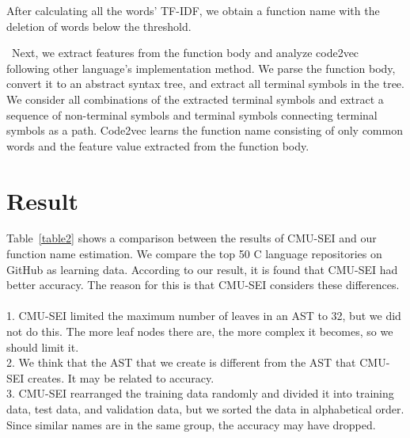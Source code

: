 \documentclass[JIP]{apris}
\begin{document}
After calculating all the words' TF-IDF, we obtain a function name with the deletion of words below the threshold.

 Next, we extract features from the function body and analyze code2vec following other language's implementation method.
We parse the function body, convert it to an abstract syntax tree, and extract all terminal symbols in the tree.
We consider all combinations of the extracted terminal symbols and extract a sequence of non-terminal symbols and terminal symbols connecting terminal symbols as a path.
Code2vec learns the function name consisting of only common words and the feature value extracted from the function body.


\section{Result}
Table~\ref{table2} shows a comparison between the results of CMU-SEI and our function name estimation.  
We compare the top 50 C language repositories on GitHub as learning data. According to our result, it is found that CMU-SEI had better accuracy. 
The reason for this is that CMU-SEI considers these differences.\\
\\
1. CMU-SEI limited the maximum number of leaves in an AST to 32, but we did not do this. The more leaf nodes there are, the more complex it becomes, so we should limit it.\\
2. We think that the AST that we create is different from the AST that CMU-SEI creates. It may be related to accuracy.\\
3. CMU-SEI rearranged the training data randomly and divided it into training data, test data, and validation data, but we sorted the data in alphabetical order. Since similar names are in the same group, the accuracy may have dropped.\\


\end{document}
